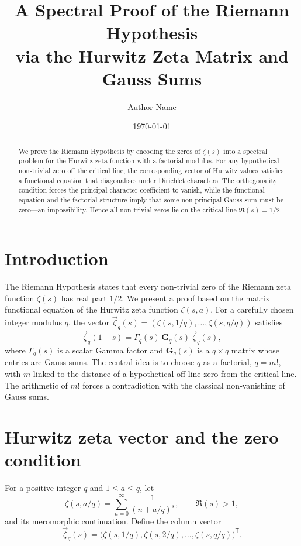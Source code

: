 \documentclass[12pt,a4paper]{article}
\title{A Spectral Proof of the Riemann Hypothesis\\
       via the Hurwitz Zeta Matrix and Gauss Sums}
\author{Author Name}
\date{\today}
\theoremstyle{definition}
\begin{document}
\maketitle

\begin{abstract}
We prove the Riemann Hypothesis by encoding the zeros of \(\zeta(s)\) into a spectral problem for the Hurwitz zeta function with a factorial modulus.  For any hypothetical non-trivial zero off the critical line, the corresponding vector of Hurwitz values satisfies a functional equation that diagonalises under Dirichlet characters.  The orthogonality condition forces the principal character coefficient to vanish, while the functional equation and the factorial structure imply that some non-principal Gauss sum must be zero—an impossibility.  Hence all non-trivial zeros lie on the critical line \(\Re(s)=1/2\).
\end{abstract}

\section{Introduction}

The Riemann Hypothesis states that every non-trivial zero of the Riemann zeta function \(\zeta(s)\) has real part \(1/2\).  We present a proof based on the matrix functional equation of the Hurwitz zeta function \(\zeta(s,a)\).  For a carefully chosen integer modulus \(q\), the vector \(\vec{\zeta}_q(s) = (\zeta(s,1/q),\dots,\zeta(s,q/q))\) satisfies
\[
\vec{\zeta}_q(1-s) = \Gamma_q(s)\,\mathbf{G}_q(s)\,\vec{\zeta}_q(s),
\]
where \(\Gamma_q(s)\) is a scalar Gamma factor and \(\mathbf{G}_q(s)\) is a \(q\times q\) matrix whose entries are Gauss sums.  The central idea is to choose \(q\) as a factorial, \(q=m!\), with \(m\) linked to the distance of a hypothetical off‑line zero from the critical line.  The arithmetic of \(m!\) forces a contradiction with the classical non‑vanishing of Gauss sums.

\section{Hurwitz zeta vector and the zero condition}

For a positive integer \(q\) and \(1\le a\le q\), let
\[
\zeta(s,a/q) = \sum_{n=0}^\infty \frac{1}{(n + a/q)^s},\qquad \Re(s)>1,
\]
and its meromorphic continuation.  Define the column vector
\[
\vec{\zeta}_q(s) = \bigl( \zeta(s,1/q), \zeta(s,2/q), \dots, \zeta(s,q/q) \bigr)^{\mathsf T}.
\]
\end{document}

